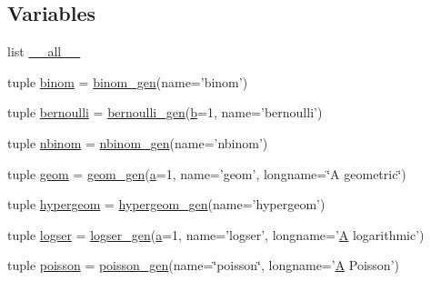 \subsection*{Variables}
\begin{DoxyCompactItemize}
\item 
list \hyperlink{namespacescipy_1_1stats_1_1__discrete__distns_a83706ca7068fd4b3d26562aa79b3113c}{\+\_\+\+\_\+all\+\_\+\+\_\+}
\item 
tuple \hyperlink{namespacescipy_1_1stats_1_1__discrete__distns_a150b4c1458a7c69d4c85e2408f25fbe2}{binom} = \hyperlink{classscipy_1_1stats_1_1__discrete__distns_1_1binom__gen}{binom\+\_\+gen}(name='binom')
\item 
tuple \hyperlink{namespacescipy_1_1stats_1_1__discrete__distns_a13a787204cac1e0ea68389a2f7f5a1f0}{bernoulli} = \hyperlink{classscipy_1_1stats_1_1__discrete__distns_1_1bernoulli__gen}{bernoulli\+\_\+gen}(\hyperlink{gen__mat5files_8m_a7b38767b3b6a8dae167e5afa4fc340b0}{b}=1, name='bernoulli')
\item 
tuple \hyperlink{namespacescipy_1_1stats_1_1__discrete__distns_ac175f9326ae4fa63deeecff2c2c58c2f}{nbinom} = \hyperlink{classscipy_1_1stats_1_1__discrete__distns_1_1nbinom__gen}{nbinom\+\_\+gen}(name='nbinom')
\item 
tuple \hyperlink{namespacescipy_1_1stats_1_1__discrete__distns_afd301673281c3e3e67f0b707a2d36ce4}{geom} = \hyperlink{classscipy_1_1stats_1_1__discrete__distns_1_1geom__gen}{geom\+\_\+gen}(\hyperlink{gen__mat5files_8m_aae328bf20413f220e38aec4d95bfd6da}{a}=1, name='geom', longname=\char`\"{}A geometric\char`\"{})
\item 
tuple \hyperlink{namespacescipy_1_1stats_1_1__discrete__distns_a384e86a8b065ea9cc1322478d4a068a0}{hypergeom} = \hyperlink{classscipy_1_1stats_1_1__discrete__distns_1_1hypergeom__gen}{hypergeom\+\_\+gen}(name='hypergeom')
\item 
tuple \hyperlink{namespacescipy_1_1stats_1_1__discrete__distns_af613f1861a67fd27e3756607b634b14c}{logser} = \hyperlink{classscipy_1_1stats_1_1__discrete__distns_1_1logser__gen}{logser\+\_\+gen}(\hyperlink{gen__mat5files_8m_aae328bf20413f220e38aec4d95bfd6da}{a}=1, name='logser', longname='\hyperlink{classA}{A} logarithmic')
\item 
tuple \hyperlink{namespacescipy_1_1stats_1_1__discrete__distns_aee3aa8ef9c359a2799da8d13cc7660ed}{poisson} = \hyperlink{classscipy_1_1stats_1_1__discrete__distns_1_1poisson__gen}{poisson\+\_\+gen}(name=\char`\"{}poisson\char`\"{}, longname='\hyperlink{classA}{A} Poisson')
\item 

\end{DoxyCompactItemize}
